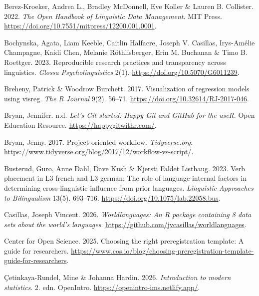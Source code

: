 \documentclass[
  letterpaper,
  DIV=11,
  numbers=noendperiod]{scrreprt}
\newlength{\cslhangindent}
\newenvironment{CSLReferences}[2] %
 {\begin{list}{}{%
  \setlength{\itemindent}{0pt}
  \setlength{\leftmargin}{0pt}
  \setlength{\parsep}{0pt}
  \ifodd #1
   \setlength{\leftmargin}{\cslhangindent}
   \setlength{\itemindent}{-1\cslhangindent}
  \fi
  \setlength{\itemsep}{#2\baselineskip}}}
 {\end{list}}
\begin{document}
\begin{CSLReferences}{1}{0}
Berez-Kroeker, Andrea L., Bradley McDonnell, Eve Koller \& Lauren B.
Collister. 2022. \emph{The {Open} {Handbook} of {Linguistic} {Data}
{Management}}. MIT Press.
\url{https://doi.org/10.7551/mitpress/12200.001.0001}.

Bochynska, Agata, Liam Keeble, Caitlin Halfacre, Joseph V. Casillas,
Irys-Amélie Champagne, Kaidi Chen, Melanie Röthlisberger, Erin M.
Buchanan \& Timo B. Roettger. 2023. Reproducible research practices and
transparency across linguistics. \emph{Glossa Psycholinguistics} 2(1).
\url{https://doi.org/10.5070/G6011239}.

Breheny, Patrick \& Woodrow Burchett. 2017. Visualization of regression
models using visreg. \emph{The R Journal} 9(2). 56--71.
\url{https://doi.org/10.32614/RJ-2017-046}.

Bryan, Jennifer. n.d. \emph{Let's {Git} started: Happy {Git} and
{GitHub} for the useR}. Open Education Resource.
\url{https://happygitwithr.com/}.

Bryan, Jenny. 2017. Project-oriented workflow. \emph{Tidyverse.org}.
\url{https://www.tidyverse.org/blog/2017/12/workflow-vs-script/}.

Busterud, Guro, Anne Dahl, Dave Kush \& Kjersti Faldet Listhaug. 2023.
Verb placement in L3 french and L3 german: The role of language-internal
factors in determining cross-linguistic influence from prior languages.
\emph{Linguistic Approaches to Bilingualism} 13(5). 693--716.
\url{https://doi.org/10.1075/lab.22058.bus}.

Casillas, Joseph Vincent. 2026. \emph{Worldlanguages: An {R} package
containing 8 data sets about the world's languages}.
\url{https://github.com/jvcasillas/worldlanguages}.

Center for Open Science. 2025. Choosing the right preregistration
template: A guide for researchers.
\url{https://www.cos.io/blog/choosing-preregistration-template-guide-for-researchers}.

Çetinkaya-Rundel, Mine \& Johanna Hardin. 2026. \emph{Introduction to
modern statistics}. 2. edn. OpenIntro.
\url{https://openintro-ims.netlify.app/}.


\end{CSLReferences}
\end{document}
